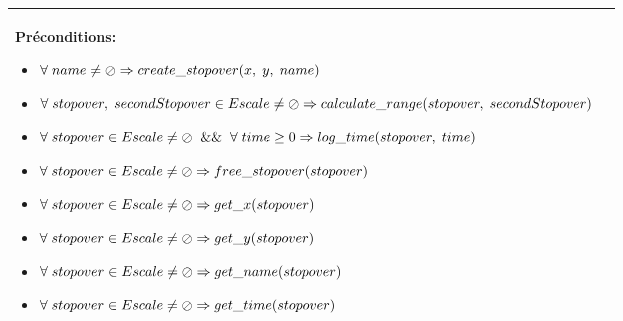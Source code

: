 \documentclass[a4paper, 11pt, oneside]{article}
\begin{document}
\begin{tabular}{|p{17cm}|c}
			\textbf{Préconditions:}
				\begin{itemize}
					\item[] $\forall \hspace{1mm} name \neq \oslash \Rightarrow create\_stopover(x, \hspace{1mm} y, \hspace{1mm} name)$
					\item[] $\forall \hspace{1mm} stopover, \hspace{1mm} secondStopover \in Escale \neq \oslash \Rightarrow calculate\_range(stopover, \hspace{1mm} secondStopover)$
					\item[] $\forall \hspace{1mm} stopover \in Escale \neq \oslash \hspace{2mm} \&\& \hspace{2mm} \forall \hspace{1mm} time \geq 0 \Rightarrow log\_time(stopover, \hspace{1mm} time) $
					\item[] $\forall \hspace{1mm} stopover \in Escale \neq \oslash \Rightarrow free\_stopover(stopover)$ 
					\item[] $\forall \hspace{1mm} stopover \in Escale \neq \oslash \Rightarrow get\_x(stopover)$ 
					\item[] $\forall \hspace{1mm} stopover \in Escale \neq \oslash \Rightarrow get\_y(stopover)$ 
					\item[] $\forall \hspace{1mm} stopover \in Escale \neq \oslash \Rightarrow get\_name(stopover)$ 
					\item[] $\forall \hspace{1mm} stopover \in Escale \neq \oslash \Rightarrow get\_time(stopover)$ 
				\end{itemize}
				
			\\	
			\hline
		\end{tabular}
		
		\footnotetext{\textcolor{red}{Nom des opérations interne}} 
		\footnotetext{\textcolor{green}{Arguments}} 
		\footnotetext{\textcolor{blue}{Types de retour}} 
		\footnotetext{\textcolor{magenta}{Nom des opérations d'observation}} 
	
\end{document}
